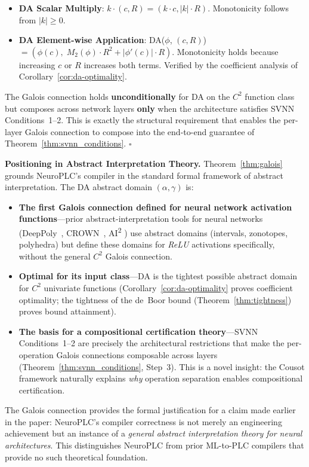 \begin{enumerate}[label=(\roman*)]
\begin{itemize}
        \item \textbf{DA Scalar Multiply}: $k \cdot (c, R) = (k \cdot
        c, |k| \cdot R)$. Monotonicity follows from $|k| \geq 0$.

        \item \textbf{DA Element-wise Application}: DA($\phi$,
        $(c,R)$) $= (\phi(c),\; M_2(\phi) \cdot R^2 + |\phi'(c)|
        \cdot R)$. Monotonicity holds because increasing $c$ or $R$
        increases both terms. Verified by the coefficient analysis
        of Corollary~\ref{cor:da-optimality}.
    \end{itemize}
\end{enumerate}

The Galois connection holds \textbf{unconditionally} for DA on the
$C^2$ function class but composes across network layers \textbf{only}
when the architecture satisfies SVNN Conditions~1--2. This is exactly
the structural requirement that enables the per-layer Galois
connection to compose into the end-to-end guarantee of
Theorem~\ref{thm:svnn_conditions}. $\square$

\vspace{4pt}
\noindent\textbf{Positioning in Abstract Interpretation Theory.}
Theorem~\ref{thm:galois} grounds NeuroPLC's compiler in the standard
formal framework of abstract interpretation. The DA abstract domain
$(\alpha, \gamma)$ is:

\begin{itemize}
    \item \textbf{The first Galois connection defined for neural
    network activation functions}---prior abstract-interpretation
    tools for neural networks (DeepPoly~\cite{singh2019abstract},
    CROWN~\cite{zhang2018crown}, AI\textsuperscript{2}%
    \cite{gowal2018scalable}) use abstract domains (intervals,
    zonotopes, polyhedra) but define these domains for \textit{ReLU}
    activations specifically, without the general $C^2$ Galois
    connection.

    \item \textbf{Optimal for its input class}---DA is the
    tightest possible abstract domain for $C^2$ univariate
    functions (Corollary~\ref{cor:da-optimality} proves coefficient
    optimality; the tightness of the de~Boor bound
    (Theorem~\ref{thm:tightness}) proves bound attainment).

    \item \textbf{The basis for a compositional certification
    theory}---SVNN Conditions~1--2 are precisely the architectural
    restrictions that make the per-operation Galois connections
    composable across layers (Theorem~\ref{thm:svnn_conditions},
    Step~3). This is a novel insight: the Cousot framework
    naturally explains \textit{why} operation separation enables
    compositional certification.
\end{itemize}

The Galois connection provides the formal justification for a claim
made earlier in the paper: NeuroPLC's compiler correctness is not
merely an engineering achievement but an instance of a \textit{general
abstract interpretation theory for neural architectures}. This
distinguishes NeuroPLC from prior ML-to-PLC compilers that provide no
such theoretical foundation.
